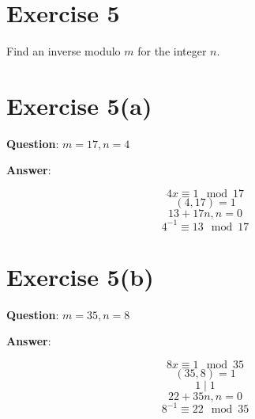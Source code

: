 \documentclass{article} %
\begin{document}
\section*{Exercise 5}
Find an inverse modulo $m$ for the integer $n$.

\section*{Exercise 5(a)}
\bigskip
\noindent
\textbf{Question}: $m = 17, n = 4$

\bigskip
\noindent
\textbf{Answer}:
\begin{center}
    \[4x \equiv 1 \mod 17\]
    \[(4, 17) = 1\]
    \[13 + 17n, n = 0\]
    \[4^{-1} \equiv 13 \mod 17\]
\end{center}

\section*{Exercise 5(b)}
\bigskip
\noindent
\textbf{Question}: $m = 35, n = 8$

\bigskip
\noindent
\textbf{Answer}:
\begin{center}
    \[8x \equiv 1 \mod 35\]
    \[(35, 8) = 1\]
    \[1 \mid 1\]
    \[22 + 35n, n = 0\]
    \[8^{-1} \equiv 22 \mod 35\]
\end{center}
\end{document}
